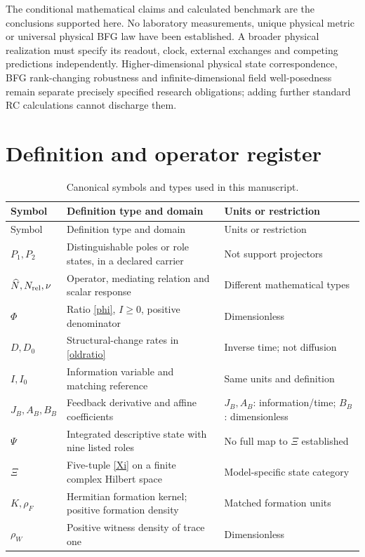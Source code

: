 \documentclass[11pt,letterpaper]{article}
\theoremstyle{definition}
\numberwithin{equation}{section}
\begin{document}
The conditional mathematical claims and calculated benchmark are the conclusions supported here. No laboratory measurements, unique physical metric or universal physical BFG law have been established. A broader physical realization must specify its readout, clock, external exchanges and competing predictions independently. Higher-dimensional physical state correspondence, BFG rank-changing robustness and infinite-dimensional field well-posedness remain separate precisely specified research obligations; adding further standard RC calculations cannot discharge them.

\clearpage
\appendix
\section{Definition and operator register}
\begin{longtable}{p{}p{}p{}}
\caption{Canonical symbols and types used in this manuscript.}\label{tab:defs}\\
\toprule Symbol & Definition type and domain & Units or restriction\\\midrule\endfirsthead
\toprule Symbol & Definition type and domain & Units or restriction\\\midrule\endhead
$P_1,P_2$ & Distinguishable poles or role states, in a declared carrier & Not support projectors\\
$\widehat N,N_{\rm rel},\nu$ & Operator, mediating relation and scalar response & Different mathematical types\\
$\Phi$ & Ratio \eqref{phi}, $I\geq0$, positive denominator & Dimensionless\\
$D,D_0$ & Structural-change rates in \eqref{oldratio} & Inverse time; not diffusion\\
$I,I_0$ & Information variable and matching reference & Same units and definition\\
$J_B,A_B,B_B$ & Feedback derivative and affine coefficients & $J_B,A_B$: information/time; $B_B$: dimensionless\\
$\Psi$ & Integrated descriptive state with nine listed roles & No full map to $\Xi$ established\\
$\Xi$ & Five-tuple \eqref{Xi} on a finite complex Hilbert space & Model-specific state category\\
$K,\rho_F$ & Hermitian formation kernel; positive formation density & Matched formation units\\
$\rho_W$ & Positive witness density of trace one & Dimensionless\\

\end{longtable}
\end{document}
